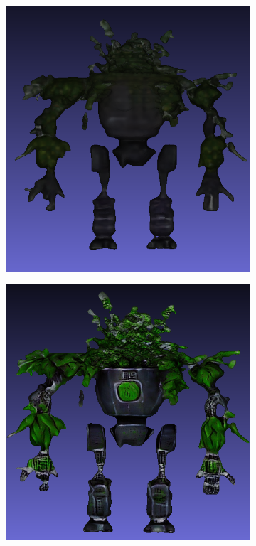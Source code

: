 \begin{figure}[H]
    \centering
    \small
    \begin{subfigure}[b]{0.25\textwidth}
        \centering
        \includegraphics[width=\textwidth]{figures/future/plantRobot_coarse.png}
        \caption{}
    \end{subfigure}
    \begin{subfigure}[b]{0.26\textwidth}
        \centering
        \includegraphics[width=\textwidth]{figures/future/plantRobot_fine_front.png}

\end{subfigure}
\end{figure}
